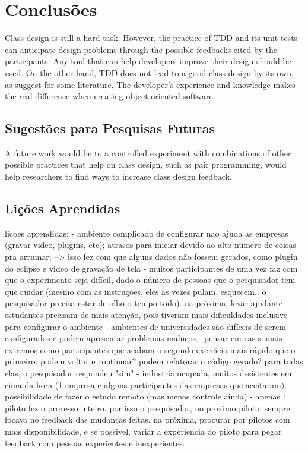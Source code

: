 \chapter{Conclusões}
\label{cap:conclusoes}

Class design is still a hard task. However, the practice of TDD and its unit tests can anticipate design problems through the possible feedbacks cited by the participants. Any tool that can help developers improve their design should be used. On the other hand, TDD does not lead to a good class design by its own, as suggest for some literature. The developer’s experience and knowledge makes the real difference when creating object-oriented software.


\section{Sugestões para Pesquisas Futuras} 

A future work would be to a controlled experiment with combinations of other possible practices that help on class design, such as pair programming, would help researchers to find ways to increase class design feedback.

\section{Lições Aprendidas}

licoes aprendidas:
- ambiente complicado de configurar nao ajuda as empresas (gravar video, plugins, etc); atrasos para iniciar devido ao alto número de coisas pra arrumar;
  --> isso fez com que alguns dados não fossem gerados, como plugin do eclipse e video de gravação de tela
- muitos participantes de uma vez faz com que o experimento seja difícil, dado o número de pessoas que o pesquisador tem que cuidar (mesmo com as instruções,
eles as vezes pulam, esquecem.. o pesquisador precisa estar de olho o tempo todo). na próxima, levar ajudante
- estudantes precisam de mais atenção, pois tiveram mais dificuldades inclusive para configurar o ambiente
- ambientes de universidades são difíceis de serem configurados e podem apresentar problemas malucos
- pensar em casos mais extremos como participantes que acabam o segundo exercício mais rápido que o primeiro: podem voltar e continuar? podem refatorar
o código gerado? para todas elas, o pesquisador respondeu "sim"
- industria ocupada, muitos desistentes em cima da hora (1 empresa e alguns participantes das empresas que aceitaram).
- possibilidade de fazer o estudo remoto (mas menos controle ainda)
- apenas 1 piloto fez o processo inteiro. por isso o pesquisador, no proximo piloto, sempre focava no feedback das mudanças feitas. na próxima,
procurar por pilotos com mais disponibilidade, e se possivel, variar a experiencia do piloto para pegar feedback com pessoas experientes e inexperientes.

